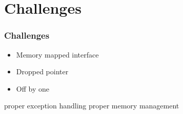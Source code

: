 \section{Challenges}

\begin{frame}
\frametitle{Challenges}
\begin{itemize}[<+->]
	\setlength\itemsep{1em}
	\item Memory mapped interface
	\item Dropped pointer
	\item Off by one
\end{itemize}

\begin{center}
\end{center}
\begin{itemize}[<+->]
	\setlength\itemsep{1em}
	\pro proper exception handling
	\pro proper memory management
\end{itemize}
\end{frame}
